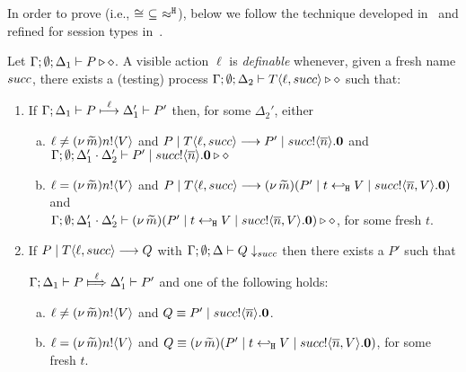 
In order to prove  (i.e., $\cong\ \subseteq\ \hwb$), below we  follow
the technique developed in~\cite{Hennessy07} and
refined for session types in~\cite{KYHH2015,KY2015}.


\begin{definition}[Definability]\myrm
	\label{app:def:definibility}
	Let $\Gamma; \emptyset; \Delta_1 \vdash P \triangleright \diamond$.
	A visible action $\ell$ is \emph{definable} whenever, given a fresh name $succ$,
	there exists a (testing) process
	$\Gamma; \emptyset; \Delta_2 \vdash T\langle \ell, succ \rangle \triangleright \diamond$
	such that:
	\begin{enumerate}[1.]
					\item	If $\Gamma; \Delta_1 \vdash P \stackrel{\ell}{\longmapsto} \Delta_1' \vdash P'$
						then, for some $\Delta_2'$, either
					\begin{enumerate}[a)]
						\item 
							$\ell \neq (\nu\, \widetilde{m})n ! \langle V \rangle$ and $P \;|\; T\langle \ell, succ \rangle \longrightarrow P' \;|\; succ ! \langle \overline{n} \rangle . \mathbf{0}$ 
							and \\
							$\Gamma; \emptyset; \Delta_1' \cdot \Delta_2' \vdash P' \;|\; succ ! \langle \overline{n} \rangle . \mathbf{0} \triangleright \diamond$  
							\item 
							$\ell = (\nu\, \widetilde{m})n ! \langle V \rangle$ and 
							$P \;|\; T\langle \ell, succ \rangle \longrightarrow
							(\nu\, \widetilde{m})(P' \;|\; t \hookleftarrow_{\mathtt{H}} V \;|\; succ ! \langle \overline{n}, V \rangle . \mathbf{0})$
							and \\
							$\Gamma; \emptyset; \Delta_1' \cdot \Delta_2' \vdash
							(\nu\, \widetilde{m})(P' \;|\; t \hookleftarrow_{\mathtt{H}} V \;|\;  succ ! \langle \overline{n}, V \rangle . \mathbf{0}) \triangleright \diamond$, for some fresh $t$.
							\end{enumerate}

			\item If $P \;|\; T\langle \ell, succ \rangle \longrightarrow Q$ with			
						$\Gamma; \emptyset; \Delta \vdash Q \downarrow_{succ}$ then there exists a $P'$ such that
					
 $\horel{\Gamma}{\Delta_1}{P}{\Hby{\ell}}{\Delta_1'}{P'}$
						 and one of the following holds:  
							\begin{enumerate}[a)]
						\item $\ell \neq (\nu\, \widetilde{m})n ! \langle V \rangle$ and $Q \equiv P' \;|\; succ ! \langle \overline{n} \rangle . \mathbf{0}$.
						\item  $\ell = (\nu\, \widetilde{m})n ! \langle V \rangle$ and  $Q \equiv (\nu\, \widetilde{m})(P' \;|\; t \hookleftarrow_{\mathtt{H}} V \;|\; succ ! \langle \overline{n}, V \rangle . \mathbf{0})$, for some fresh $t$.
						\end{enumerate}
				 

\end{enumerate}
\end{definition}
